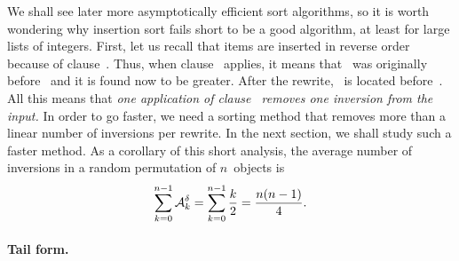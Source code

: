 We shall see later more asymptotically efficient sort algorithms, so
it is worth wondering why insertion sort fails short to be a good
algorithm, at least for large lists of integers. First, let us recall
that items are inserted in reverse order because of
clause~\clause{\gamma}. Thus, when clause~\clause{\delta} applies, it
means that ~was originally before~ and it is
found now to be greater. After the rewrite, ~is located
before~. All this means that \emph{one application of
  clause~\clause{\delta} removes one inversion from the input.} In
order to go faster, we need a sorting method that removes more than a
linear number of inversions per rewrite. In the next section, we shall
study such a faster method. As a corollary of this short analysis, the
average number of inversions in a random permutation of \(n\)~objects
is
\[
\sum_{k=0}^{n-1}{\mathcal{A}_{k}^{\delta}} =
\sum_{k=0}^{n-1}{\frac{k}{2}} = \frac{n(n-1)}{4}.
\]

\smallskip

\paragraph{Tail form.}

